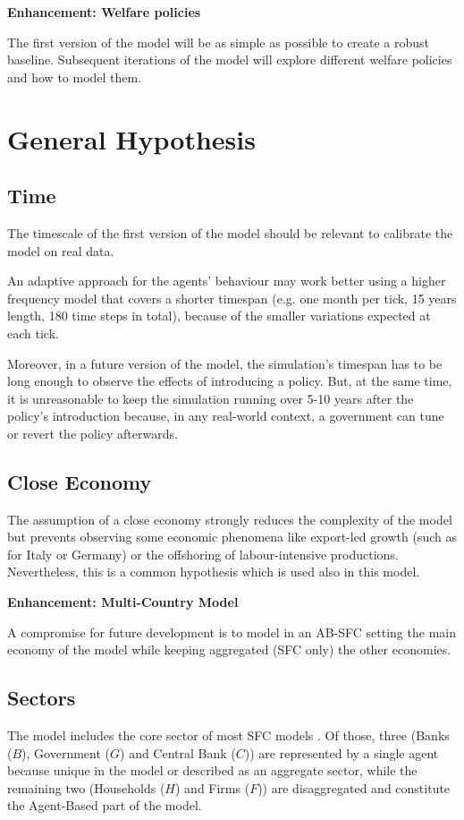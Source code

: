 \documentclass[a4paper, headings=standardclasses]{scrartcl}
\newenvironment{enh}[1][]{\begin{framed}\noindent\textbf{Enhancement: #1}\par}{\end{framed}}
\begin{document}
\begin{enh}[Welfare policies]
	The first version of the model will be as simple as possible to create a robust baseline.
	Subsequent iterations of the model will explore different welfare policies and how to model them.
\end{enh}

\section{General Hypothesis}
\subsection{Time}
The timescale of the first version of the model should be relevant to calibrate the model on real data.

An adaptive approach for the agents' behaviour may work better using a higher frequency model that covers a shorter timespan (e.g. one month per tick, 15 years length, 180 time steps in total), because of the smaller variations expected at each tick.

Moreover, in a future version of the model, the simulation's timespan has to be long enough to observe the effects of introducing a policy. But, at the same time, it is unreasonable to keep the simulation running over 5-10 years after the policy's introduction because, in any real-world context, a government can tune or revert the policy afterwards.

\subsection{Close Economy}
The assumption of a close economy strongly reduces the complexity of the model but prevents observing some economic phenomena like export-led growth (such as for Italy or Germany) or the offshoring of labour-intensive productions.
Nevertheless, this is a common hypothesis which is used also in this model.

\begin{enh}[Multi-Country Model]
	A compromise for future development is to model in an AB-SFC setting the main economy of the model while keeping aggregated (SFC only) the other economies.
\end{enh}

\subsection{Sectors}
The model includes the core sector of most SFC models \parencite{nikiforos2017}. Of those, three (Banks ($B$), Government ($G$) and Central Bank ($C$)) are represented by a single agent because unique in the model or described as an aggregate sector, while the remaining two (Households ($H$) and Firms ($F$)) are disaggregated and constitute the Agent-Based part of the model.
\end{document}
